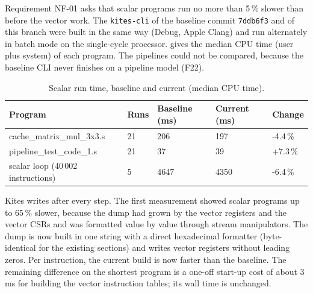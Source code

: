 Requirement NF-01 asks that scalar programs run no more than 5\,\% slower than before the
vector work. The \texttt{kites-cli} of the baseline commit \texttt{7ddb6f3} and of this branch
were built in the same way (Debug, Apple Clang) and run alternately in batch mode on the
single-cycle processor.  gives the median CPU time (user plus system) of each
program. The pipelines could not be compared, because the baseline CLI never finishes on a
pipeline model (F22).

\begin{table}[H]
\centering\small
\caption{Scalar run time, baseline and current (median CPU time).}\label{tab:perf}
\begin{tabularx}{\textwidth}{@{}YL{1.2cm}L{2.0cm}L{2.0cm}L{1.6cm}@{}}
\toprule
Program & Runs & Baseline (ms) & Current (ms) & Change \\
\midrule
cache\_matrix\_mul\_3x3.s & 21 & 206 & 197 & -4.4\,\% \\
pipeline\_test\_code\_1.s & 21 & 37 & 39 & +7.3\,\% \\
scalar loop (40\,002 instructions) & 5 & 4647 & 4350 & -6.4\,\% \\
\bottomrule
\end{tabularx}
\end{table}

Kites writes  after every step. The first measurement showed scalar
programs up to 65\,\% slower, because the dump had grown by the vector registers and the vector
CSRs and was formatted value by value through stream manipulators. The dump is now built in one
string with a direct hexadecimal formatter (byte-identical for the existing sections) and writes
vector registers without leading zeros. Per instruction, the current build is now faster than
the baseline. The remaining difference on the shortest program is a one-off start-up cost of
about 3\,ms for building the vector instruction tables; its wall time is unchanged.
